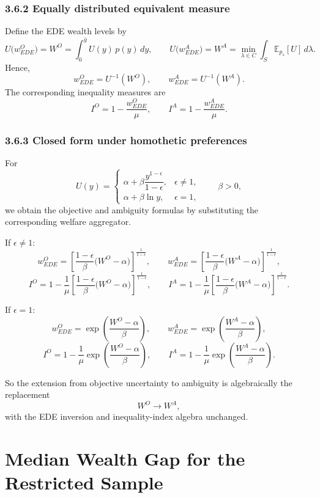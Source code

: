 \documentclass[../../../00-main.tex]{subfiles}
\begin{document}
\subsubsection*{3.6.2 Equally distributed equivalent measure}

Define the EDE wealth levels by
\[
U\big(w_{EDE}^O\big)=W^{O} = \int_0^{\bar y} U(y)\,p(y)\,dy,
\qquad
U\big(w_{EDE}^A\big)= W^{A} = \min_{\lambda\in C}\int_S \mathbb{E}_{p_s}[U] \, d\lambda.
\]
Hence,
\[
w_{EDE}^O = U^{-1}(W^{O}),
\qquad
w_{EDE}^A = U^{-1}(W^{A}).
\]
The corresponding inequality measures are
\[
I^{O} = 1-\frac{w_{EDE}^O}{\mu},
\qquad
I^{A} = 1-\frac{w_{EDE}^A}{\mu}.
\]

\subsubsection*{3.6.3 Closed form under homothetic preferences}

For
\[
U(y)=
\begin{cases}
\alpha + \beta\dfrac{y^{1-\epsilon}}{1-\epsilon}, & \epsilon\neq 1,\\
\alpha + \beta\ln y, & \epsilon=1,
\end{cases}
\qquad \beta>0,
\]
we obtain the objective and ambiguity formulas by substituting the corresponding welfare aggregator.

If $\epsilon\neq 1$:
\[
w_{EDE}^O=\left[\frac{1-\epsilon}{\beta}\big(W^{O}-\alpha\big)\right]^{\frac{1}{1-\epsilon}},
\qquad
w_{EDE}^A=\left[\frac{1-\epsilon}{\beta}\big(W^{A}-\alpha\big)\right]^{\frac{1}{1-\epsilon}},
\]
\[
I^{O} = 1-\frac{1}{\mu}\left[\frac{1-\epsilon}{\beta}\big(W^{O}-\alpha\big)\right]^{\frac{1}{1-\epsilon}},
\qquad
I^{A} = 1-\frac{1}{\mu}\left[\frac{1-\epsilon}{\beta}\big(W^{A}-\alpha\big)\right]^{\frac{1}{1-\epsilon}}.
\]

If $\epsilon=1$:
\[
w_{EDE}^O=\exp\!\left(\frac{W^{O}-\alpha}{\beta}\right),
\qquad
w_{EDE}^A=\exp\!\left(\frac{W^{A}-\alpha}{\beta}\right),
\]
\[
I^{O} = 1-\frac{1}{\mu}\exp\!\left(\frac{W^{O}-\alpha}{\beta}\right),
\qquad
I^{A} = 1-\frac{1}{\mu}\exp\!\left(\frac{W^{A}-\alpha}{\beta}\right).
\]

\par So the extension from objective uncertainty to ambiguity is algebraically the replacement
\[
W^{O} \longrightarrow W^{A},
\]
with the EDE inversion and inequality-index algebra unchanged.

\section{Median Wealth Gap for the Restricted Sample}
\label{app:restricted-gap-diagnostic}
\end{document}
